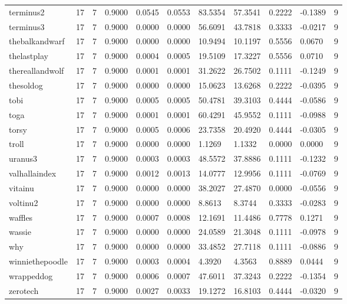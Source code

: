 \begin{table}[htbp]
\begin{tabular}{lllllllllll}
terminus2 & 17 & 7 & 0.9000 & 0.0545 & 0.0553 & 83.5354 & 57.3541 & 0.2222 & -0.1389 & 9 \\
terminus3 & 17 & 7 & 0.9000 & 0.0000 & 0.0000 & 56.6091 & 43.7818 & 0.3333 & -0.0217 & 9 \\
thebalkandwarf & 17 & 7 & 0.9000 & 0.0000 & 0.0000 & 10.9494 & 10.1197 & 0.5556 & 0.0670 & 9 \\
thelastplay & 17 & 7 & 0.9000 & 0.0004 & 0.0005 & 19.5109 & 17.3227 & 0.5556 & 0.0710 & 9 \\
thereallandwolf & 17 & 7 & 0.9000 & 0.0001 & 0.0001 & 31.2622 & 26.7502 & 0.1111 & -0.1249 & 9 \\
thesoldog & 17 & 7 & 0.9000 & 0.0000 & 0.0000 & 15.0623 & 13.6268 & 0.2222 & -0.0395 & 9 \\
tobi & 17 & 7 & 0.9000 & 0.0005 & 0.0005 & 50.4781 & 39.3103 & 0.4444 & -0.0586 & 9 \\
toga & 17 & 7 & 0.9000 & 0.0001 & 0.0001 & 60.4291 & 45.9552 & 0.1111 & -0.0988 & 9 \\
torsy & 17 & 7 & 0.9000 & 0.0005 & 0.0006 & 23.7358 & 20.4920 & 0.4444 & -0.0305 & 9 \\
troll & 17 & 7 & 0.9000 & 0.0000 & 0.0000 & 1.1269 & 1.1332 & 0.0000 & 0.0000 & 9 \\
uranus3 & 17 & 7 & 0.9000 & 0.0003 & 0.0003 & 48.5572 & 37.8886 & 0.1111 & -0.1232 & 9 \\
valhallaindex & 17 & 7 & 0.9000 & 0.0012 & 0.0013 & 14.0777 & 12.9956 & 0.1111 & -0.0769 & 9 \\
vitainu & 17 & 7 & 0.9000 & 0.0000 & 0.0000 & 38.2027 & 27.4870 & 0.0000 & -0.0556 & 9 \\
voltinu2 & 17 & 7 & 0.9000 & 0.0000 & 0.0000 & 8.8613 & 8.3744 & 0.3333 & -0.0283 & 9 \\
waffles & 17 & 7 & 0.9000 & 0.0007 & 0.0008 & 12.1691 & 11.4486 & 0.7778 & 0.1271 & 9 \\
wassie & 17 & 7 & 0.9000 & 0.0000 & 0.0000 & 24.0589 & 21.3048 & 0.1111 & -0.0978 & 9 \\
why & 17 & 7 & 0.9000 & 0.0000 & 0.0000 & 33.4852 & 27.7118 & 0.1111 & -0.0886 & 9 \\
winniethepoodle & 17 & 7 & 0.9000 & 0.0003 & 0.0004 & 4.3920 & 4.3563 & 0.8889 & 0.0444 & 9 \\
wrappeddog & 17 & 7 & 0.9000 & 0.0006 & 0.0007 & 47.6011 & 37.3243 & 0.2222 & -0.1354 & 9 \\
zerotech & 17 & 7 & 0.9000 & 0.0027 & 0.0033 & 19.1272 & 16.8103 & 0.4444 & -0.0320 & 9 \\

\end{tabular}
\end{table}
